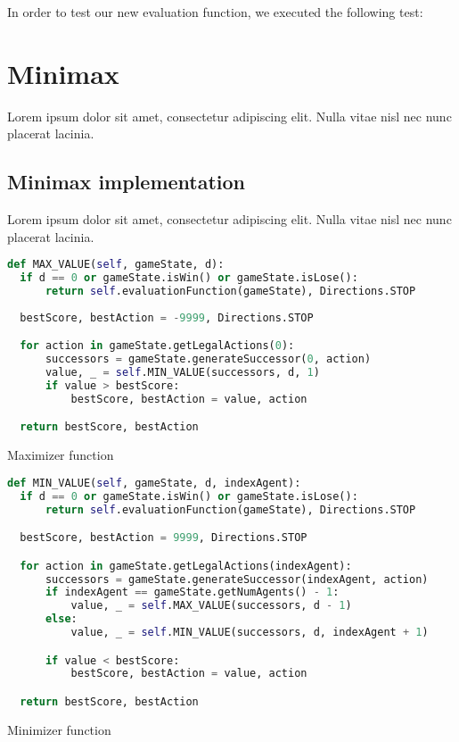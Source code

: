 \documentclass{article}
\begin{document}
In order to test our new evaluation function, we executed the following test:

\section{Minimax}

Lorem ipsum dolor sit amet, consectetur adipiscing elit. Nulla vitae nisl nec nunc placerat lacinia.

\subsection{Minimax implementation}

Lorem ipsum dolor sit amet, consectetur adipiscing elit. Nulla vitae nisl nec nunc placerat lacinia.

\begin{table}[!ht]
\begin{lstlisting}[language=python, frame=tlbr, framesep=6pt, backgroundcolor=\color{light-gray}]
def MAX_VALUE(self, gameState, d):
  if d == 0 or gameState.isWin() or gameState.isLose():
      return self.evaluationFunction(gameState), Directions.STOP
  
  bestScore, bestAction = -9999, Directions.STOP

  for action in gameState.getLegalActions(0):
      successors = gameState.generateSuccessor(0, action)
      value, _ = self.MIN_VALUE(successors, d, 1)
      if value > bestScore:
          bestScore, bestAction = value, action

  return bestScore, bestAction
\end{lstlisting}
\caption{Maximizer function}
\end{table}

\begin{table}[!ht]
\begin{lstlisting}[language=python, frame=tlbr, framesep=6pt, backgroundcolor=\color{light-gray}]
def MIN_VALUE(self, gameState, d, indexAgent):
  if d == 0 or gameState.isWin() or gameState.isLose():
      return self.evaluationFunction(gameState), Directions.STOP

  bestScore, bestAction = 9999, Directions.STOP

  for action in gameState.getLegalActions(indexAgent):
      successors = gameState.generateSuccessor(indexAgent, action)
      if indexAgent == gameState.getNumAgents() - 1:
          value, _ = self.MAX_VALUE(successors, d - 1)
      else:
          value, _ = self.MIN_VALUE(successors, d, indexAgent + 1)

      if value < bestScore:
          bestScore, bestAction = value, action

  return bestScore, bestAction
\end{lstlisting}
\caption{Minimizer function}
\end{table}
\end{document}
